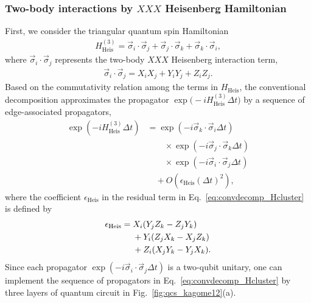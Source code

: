 \documentclass[aps,showpacs,amsmath,amssymb,twocolumn,prx,longbibliography,superscriptaddress,notitlepage,floatfix,10pt]{revtex4-2}
\begin{document}
\subsubsection{Two-body interactions by $XXX$ Heisenberg Hamiltonian}

First, we consider the triangular quantum spin Hamiltonian 
\begin{equation}
\begin{split}
    H_{\mathrm{Heis}}^{(3)} = \vec{\sigma}_{i} \cdot \vec{\sigma}_{j} + \vec{\sigma}_{j} \cdot \vec{\sigma}_{k} + \vec{\sigma}_{k} \cdot \vec{\sigma}_{i},
\end{split}
\end{equation}
where $\vec{\sigma}_{i} \cdot \vec{\sigma}_{j}$ represents the two-body $XXX$ Heisenberg interaction term,
\begin{equation}
\begin{split}
    \vec{\sigma}_{i} \cdot \vec{\sigma}_{j} = X_{i}X_{j} + Y_{i}Y_{j} + Z_{i}Z_{j}.
\end{split}
\end{equation}
Based on the commutativity relation among the terms in $H_{\mathrm{Heis}}$, the conventional decomposition approximates the propagator $\exp\bigl(-iH_{\mathrm{Heis}}^{(3)}\Delta t\bigr)$ by a sequence of edge-associated propagators,
\begin{equation}\label{eq:convdecomp_Hcluster}
    \begin{split}
        \exp\left(-iH_{\mathrm{Heis}}^{(3)}\Delta t\right)
        &= \exp\left(-i\vec{\sigma}_{k}\cdot\vec{\sigma}_{i}\Delta t\right) \\
        &\quad\quad \times \exp\left(-i\vec{\sigma}_{j}\cdot\vec{\sigma}_{k}\Delta t\right) \\
        &\quad\quad \times \exp\left(-i\vec{\sigma}_{i}\cdot\vec{\sigma}_{j}\Delta t\right) \\
        &\quad+ O(\epsilon_{\mathrm{Heis}}(\Delta t)^{2}),
    \end{split}
\end{equation}
where the coefficient $\epsilon_{\mathrm{Heis}}$ in the residual term in Eq.~\eqref{eq:convdecomp_Hcluster} is defined by
\begin{equation}\label{eq:epsilon_{1}}
\begin{split}
    \epsilon_{\mathrm{Heis}}
    &=X_{i}(Y_{j}Z_{k} - Z_{j}Y_{k}) \\
    &\quad~ + Y_{i}(Z_{j}X_{k} - X_{j}Z_{k}) \\
    &\quad~ + Z_{i}(X_{j}Y_{k} - Y_{j}X_{k}).
\end{split}
\end{equation}
Since each propagator $\exp\left(-i\vec{\sigma}_{i}\cdot\vec{\sigma}_{j}\Delta t\right)$ is a two-qubit unitary, one can implement the sequence of propagators in Eq.~\eqref{eq:convdecomp_Hcluster} by three layers of quantum circuit in Fig.~\ref{fig:qcs_kagome12}(a).
\end{document}
